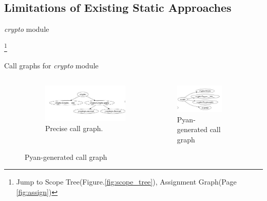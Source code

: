 \documentclass[9pt, xcolor=table]{beamer}
\begin{document}
\subsection{Limitations of Existing Static Approaches}
%
\begin{frame}{\textit{crypto} module}
	\begin{center}
		\label{code:crypto}	
	\end{center}
	\footnote{Jump to Scope Tree(Figure.\ref{fig:scope_tree}), Assignment Graph(Page \ref{fig:assign})}
\end{frame}
%
\begin{frame}{Call graphs for \textit{crypto} module}
	\begin{figure}[htp]
		\begin{columns}[totalwidth=\linewidth]
			\begin{column}{0.3\columnwidth}
				\begin{subfigure}
					\centering
					\includegraphics[width=0.33\paperwidth,height=0.33\paperheight]{call_graph_compare_a.jpg}
					\caption{Precise call graph.}
					\label{subfig:call_graph_compare_a}
				\end{subfigure}
			\end{column}
			\begin{column}{0.3\columnwidth}
				\begin{subfigure}
					\centering
					\includegraphics[width=0.33\paperwidth,height=0.33\paperheight]{call_graph_compare_b.jpg}
					\caption{Pyan-generated call graph}
					\label{subfig:call_graph_compare_b}
				\end{subfigure}
			\end{column}

\end{columns}
\end{figure}
\end{frame}
\end{document}
